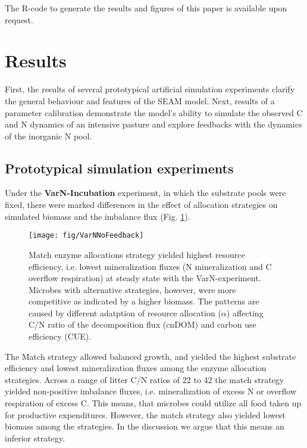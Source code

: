 The R-code to generate the results and figures of this paper is available upon
request. 
 
\section{Results}

First, the results of several prototypical artificial simulation experiments
clarify the general behaviour and features of the SEAM model. Next, results of a
parameter calibration demonstrate the model's ability to
simulate the observed C and N dynamics of an intensive pasture and explore
feedbacks with the dynamics of the inorganic N pool.

\subsection{Prototypical simulation experiments}
\label{sec:ResultsProto}

Under the \textbf{VarN-Incubation} experiment, in which the substrate pools were fixed,
there were marked differences in the effect of allocation strategies on simulated biomass and the imbalance flux (Fig.
\ref{fig:VarNNoFeedback}).
 
\begin{figure}[t] \vspace*{2mm}
\begin{center}
\texttt{[image: fig/VarNNoFeedback]}
\end{center}
\caption{
Match enzyme allocations strategy yielded highest resource efficiency, i.e.
lowest mineralization fluxes (N mineralization and C overflow respiration) at
steady state with the VarN-experiment.
Microbes with alternative strategies, however, were more competitive as
indicated by a higher biomass. The patterns are caused by different adatption of
resource allocation ($\alpha$) affecting C/N ratio of the decomposition flux
(cnDOM) and carbon use efficiency (CUE).
\label{fig:VarNNoFeedback}} 
\end{figure}

The Match strategy allowed balanced growth, and yielded the highest substrate
efficiency and lowest mineralization fluxes among the enzyme allocation
strategies. Across a range of litter C/N ratios of 22 to 42 the match strategy
yielded non-positive imbalance fluxes, i.e. mineralization of excess N or
overflow respiration of excess C. This means, that microbes could utilize all food taken
up for productive expenditures. However, the match strategy also
yielded lowest biomass among the strategies. In the discussion we argue that
this means an inferior strategy.

